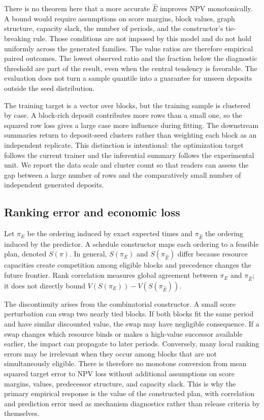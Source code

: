 \documentclass[11pt]{article}
\begin{document}
There is no theorem here that a more accurate $\hat E$ improves NPV monotonically. A bound would require assumptions on score margins, block values, graph structure, capacity slack, the number of periods, and the constructor's tie-breaking rule. Those conditions are not imposed by this model and do not hold uniformly across the generated families. The value ratios are therefore empirical paired outcomes. The lowest observed ratio and the fraction below the diagnostic threshold are part of the result, even when the central tendency is favorable. The evaluation does not turn a sample quantile into a guarantee for unseen deposits outside the seed distribution.

The training target is a vector over blocks, but the training sample is clustered by case. A block-rich deposit contributes more rows than a small one, so the squared row loss gives a large case more influence during fitting. The downstream summaries return to deposit-seed clusters rather than weighting each block as an independent replicate. This distinction is intentional: the optimization target follows the current trainer and the inferential summary follows the experimental unit. We report the data scale and cluster count so that readers can assess the gap between a large number of rows and the comparatively small number of independent generated deposits.

\subsection{Ranking error and economic loss}
Let $\pi_E$ be the ordering induced by exact expected times and $\pi_{\hat E}$ the ordering induced by the predictor. A schedule constructor maps each ordering to a feasible plan, denoted $S(\pi)$. In general, $S(\pi_E)$ and $S(\pi_{\hat E})$ differ because resource capacities create competition among eligible blocks and precedence changes the future frontier. Rank correlation measures global agreement between $\pi_E$ and $\pi_{\hat E}$; it does not directly bound $V(S(\pi_E))-V(S(\pi_{\hat E}))$.

The discontinuity arises from the combinatorial constructor. A small score perturbation can swap two nearly tied blocks. If both blocks fit the same period and have similar discounted value, the swap may have negligible consequence. If a swap changes which resource binds or makes a high-value successor available earlier, the impact can propagate to later periods. Conversely, many local ranking errors may be irrelevant when they occur among blocks that are not simultaneously eligible. There is therefore no monotone conversion from mean squared target error to NPV loss without additional assumptions on score margins, values, predecessor structure, and capacity slack. This is why the primary empirical response is the value of the constructed plan, with correlation and prediction error used as mechanism diagnostics rather than release criteria by themselves.
\end{document}
